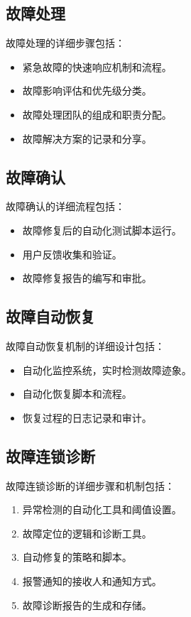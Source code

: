 \subsection{故障处理}
故障处理的详细步骤包括：
\begin{itemize}
	\item 紧急故障的快速响应机制和流程。
	\item 故障影响评估和优先级分类。
	\item 故障处理团队的组成和职责分配。
	\item 故障解决方案的记录和分享。
\end{itemize}

\subsection{故障确认}
故障确认的详细流程包括：
\begin{itemize}
	\item 故障修复后的自动化测试脚本运行。
	\item 用户反馈收集和验证。
	\item 故障修复报告的编写和审批。
\end{itemize}

\subsection{故障自动恢复}
故障自动恢复机制的详细设计包括：
\begin{itemize}
	\item 自动化监控系统，实时检测故障迹象。
	\item 自动化恢复脚本和流程。
	\item 恢复过程的日志记录和审计。
\end{itemize}

\subsection{故障连锁诊断}
故障连锁诊断的详细步骤和机制包括：
\begin{enumerate}
	\item 异常检测的自动化工具和阈值设置。
	\item 故障定位的逻辑和诊断工具。
	\item 自动修复的策略和脚本。
	\item 报警通知的接收人和通知方式。
	\item 故障诊断报告的生成和存储。
\end{enumerate}